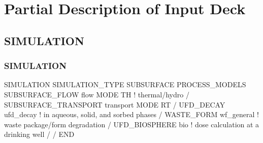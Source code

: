 \documentclass{beamer}
\newcommand\bluecomment[1]{{{\color{blue} #1}}}
\begin{document}

\section{Partial Description of Input Deck}

\subsection{SIMULATION}

\begin{frame}[fragile]\frametitle{SIMULATION}

\begin{semiverbatim}\small
SIMULATION
  SIMULATION_TYPE SUBSURFACE
  PROCESS_MODELS
    SUBSURFACE_FLOW flow
      MODE TH \bluecomment{! thermal/hydro}
    /   
    SUBSURFACE_TRANSPORT transport
      MODE RT
    /
    UFD_DECAY ufd_decay \bluecomment{! in aqueous, solid, and sorbed phases}
    /
    WASTE_FORM wf_general \bluecomment{! waste package/form degradation}
    /
    UFD_BIOSPHERE bio \bluecomment{! dose calculation at a drinking well}
    /
  /
END
\end{semiverbatim}

\end{frame}
\end{document}

